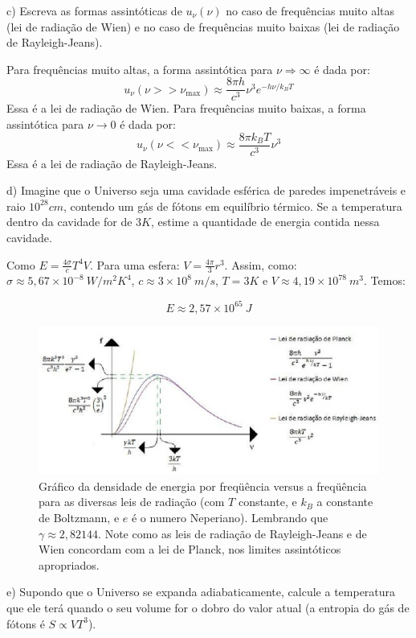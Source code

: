 \begin{enumerate}[start=1,label={\bfseries Q\arabic*.}]
c) Escreva as formas assintóticas de $u_{\nu}(\nu)$ no caso de frequências muito altas (lei de radiação de Wien) e no caso de frequências muito baixas (lei de radiação de Rayleigh-Jeans).

\resposta Para frequências muito altas, a forma assintótica para $\nu \Rightarrow \infty$ é dada por:
$$
u_{\nu} (\nu >> \nu_{\max}) \approx \frac{8\pi h}{c^{3}} \nu^{3} e^{-h \nu/k_{B} T}
$$
Essa é a lei de radiação de Wien. Para frequências muito baixas, a forma assintótica para $\nu \rightarrow 0$ é dada por:
$$
u_{\nu} (\nu << \nu_{\max}) \approx \frac{8\pi k_{B} T}{c^{3}} \nu^{3}
$$
Essa é a lei de radiação de Rayleigh-Jeans.



d) Imagine que o Universo seja uma cavidade esférica de paredes impenetráveis e raio $10^{28} cm$, contendo um gás de fótons em equilíbrio térmico. Se a temperatura dentro da cavidade for de $3 K$, estime a quantidade de energia contida nessa cavidade.

\resposta Como $E = \frac{4 \sigma}{c} T^{4} V$. Para uma esfera: $V = \frac{4 \pi}{3} r^{3}$. Assim, como: $\sigma \approx 5,67 \times 10^{-8} \ W/m^{2} K^{4}$, $c \approx 3 \times 10^{8} \ m/s$, $T = 3K$ e $V \approx 4,19 \times 10^{78} \ m^{3}$. Temos:

$$E \approx 2,57 \times 10^{65} \ J $$

\begin{figure}[H]
  \centering
  \includegraphics[scale=0.7]{moderna-img/jeans.png}
  \caption{Gráfico da densidade de energia por freqüência versus a freqüência para as diversas leis de radiação (com $T$ constante, e $k_{B}$ a constante de Boltzmann, e $e$ é o numero Neperiano). Lembrando que $\gamma \approx 2,82144$. Note como as leis de radiação de Rayleigh-Jeans e de Wien concordam com a lei de Planck, nos limites assintóticos apropriados.}
\end{figure}


e) Supondo que o Universo se expanda adiabaticamente, calcule a temperatura que ele terá quando o seu volume for o dobro do valor atual (a entropia do gás de fótons é $S \propto V T^{3}$).


\end{enumerate}
